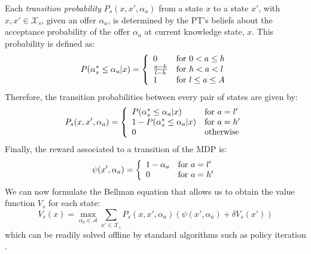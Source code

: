 Each \textit{transition probability} $P_s(x,x',\alpha_a)$ from a state $x$ to a state $x'$, with $x, x' \in \mathcal{X}_s$, given an offer $\alpha_a$, is determined by the PT's beliefs about the acceptance probability of the offer $\alpha_a$ at current knowledge state, $x$. This probability is defined as:
\begin{equation}
 P(\alpha_s^* \leq \alpha_a|x) = \left\{ 
  \begin{array}{l l}
    0 & \text{for } 0 < a \leq h\\
    \frac{a-h}{l-h} & \text{for } h < a < l \\
    1 & \text{for } l \leq a \leq A 
  \end{array} \right.
\end{equation}
Therefore, the transition probabilities between every pair of states are given by:
\begin{equation}
 P_s(x,x',\alpha_a) = \left\{ 
  \begin{array}{l l}
    P(\alpha_s^* \leq\alpha_a|x) & \text{for } a = l'\\
    1 - P(\alpha_s^* \leq\alpha_a|x) & \text{for } a = h'\\
    0 & \text{otherwise}
  \end{array} \right.
\end{equation}
Finally, the reward associated to a transition of the MDP is: 
\begin{equation}
\psi(x',\alpha_a) = \left\{ 
  \begin{array}{l l}
    1 - \alpha_a & \text{for } a = l'\\
    0 & \text{for } a = h'\\
  \end{array} \right.
\end{equation}
We can now formulate the Bellman equation that allows us to obtain the value function $V_s$ for each state:
\begin{equation}\label{eq:MDP}
V_s(x) = \max_{\alpha_a \in \mathcal{A}} \sum_{x' \in \mathcal{X}_s} P_s(x,x',\alpha_a)(\psi(x',\alpha_a)+\delta V_s(x'))
\end{equation}
which can be readily solved offline by standard algorithms such as policy iteration \cite{ref:Bertsekas2012}.
